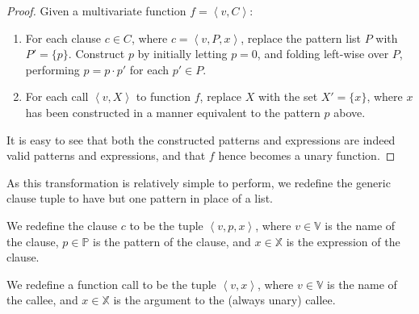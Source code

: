 \begin{proof}

Given a multivariate function $f= \left\langle v,C \right\rangle$:

\begin{enumerate}

\item For each clause $c\in C$, where $c=\left\langle v,P,x \right\rangle$,
replace the pattern list $P$ with $P'=\{p\}$. Construct $p$ by initially
letting $p=0$, and folding left-wise over $P$, performing $p=p\cdot p'$ for
each $p'\in P$. 

\item For each call $\left\langle v, X\right\rangle$ to function $f$, replace
$X$ with the set $X'=\{x\}$, where $x$ has been constructed in a manner
equivalent to the pattern $p$ above.

\end{enumerate}

It is easy to see that both the constructed patterns and expressions are indeed
valid patterns and expressions, and that $f$ hence becomes a unary
function.\end{proof}

As this transformation is relatively simple to perform, we redefine the generic
clause tuple to have but one pattern in place of a list. 

\begin{definition}\label{definition:unary-clause} We redefine the clause $c$ to
be the tuple $\left\langle v,p,x\right\rangle$, where $v\in\mathbb{V}$ is the
name of the clause, $p\in\mathbb{P}$ is the pattern of the clause, and
$x\in\mathbb{X}$ is the expression of the clause.\end{definition}

\begin{definition}\label{definition:unary-function-call} We redefine a function
call to be the tuple $\left\langle v,x\right\rangle$, where $v\in\mathbb{V}$ is
the name of the callee, and $x\in\mathbb{X}$ is the argument to the (always
unary) callee.\end{definition}
